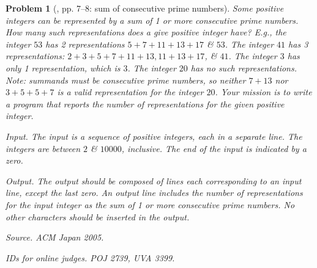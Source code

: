 \documentclass{article}
\newtheorem{problem}{Problem}
\begin{document}
\begin{problem}[\cite{Wu_Wang2016}, pp. 7--8: sum of consecutive prime numbers]
	Some positive integers can be represented by a sum of 1 or more consecutive prime numbers. How many such representations does a give positive integer have? E.g., the integer $53$ has 2 representations $5 + 7 + 11 + 13 + 17$ \& $53$. The integer $41$ has 3 representations: $2+ 3 + 5 + 7 + 11 + 13, 11 + 13 + 17$, \& $41$. The integer $3$ has only 1 representation, which is $3$. The integer $20$ has no such representations. Note: summands must be consecutive prime numbers, so neither $7 + 13$ nor $3 + 5 + 5 + 7$ is a valid representation for the integer $20$. Your mission is to write a program that reports the number of representations for the given positive integer.
	\item {\sf Input.} The input is a sequence of positive integers, each in a separate line. The integers are between $2$ \& $10000$, inclusive. The end of the input is indicated by a zero.
	\item {\sf Output.} The output should be composed of lines each corresponding to an input line, except the last zero. An output line includes the number of representations for the input integer as the sum of 1 or more consecutive prime numbers. No other characters should be inserted in the output.
	\item {\sf Source.} ACM Japan 2005.
	\item {\sf IDs for online judges}. POJ 2739, UVA 3399.
\end{problem}
\end{document}
